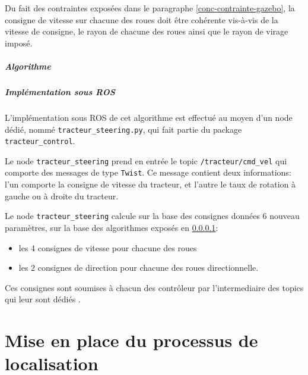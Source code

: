\documentclass[12pt,a4paper]{report}
\begin{document}
		
		
			Du fait des contraintes exposées dans le paragraphe \ref{conc-contrainte-gazebo}, la consigne de vitesse sur chacune des roues doit être cohérente vis-à-vis de la vitesse de consigne, le rayon de chacune des roues ainsi que le rayon de virage imposé.
			
			\paragraph{Algorithme}
			\label{algo-steering}
			
			
			\paragraph{Implémentation sous ROS}
			
			L'implémentation sous ROS de cet algorithme est effectué au moyen d'un node dédié, nommé \verb|tracteur_steering.py|, qui fait partie du package \verb|tracteur_control|.
			
			\para Le node \verb|tracteur_steering| prend en entrée le topic \verb|/tracteur/cmd_vel| qui comporte des messages de type \verb|Twist|. Ce message contient deux informations: l'un comporte la consigne de vitesse du tracteur, et l'autre le taux de rotation à gauche ou à droite du tracteur.
			
			\para Le node \verb|tracteur_steering| calcule sur la base des consignes données 6 nouveau paramètres, sur la base des algorithmes exposés en \ref{algo-steering}:
			\begin{itemize}
				\item les 4 consignes de vitesse pour chacune des roues
				\item les 2 consignes de direction pour chacune des roues directionnelle.
			\end{itemize}
		
			\para Ces consignes sont soumises à chacun des contrôleur par l'intermediaire des topics qui leur sont dédiés .
			
			
			
		
		
		

\chapter{Mise en place du processus de localisation}
\end{document}
